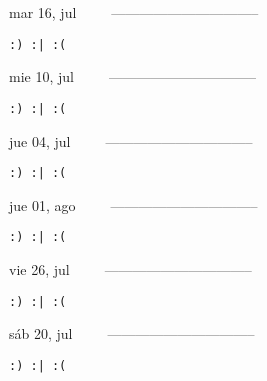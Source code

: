 \documentclass[letterpaper,10pt]{article}
\begin{document}
\begin{multicols}{3}
{mar 16, jul\ \ \ \ \ --------------------------------}
\begin{flushright}\begin{small}\texttt{:) :| :(}\end{small}\end{flushright}
\vfill
{mie 10, jul\ \ \ \ \ --------------------------------}
\begin{flushright}\begin{small}\texttt{:) :| :(}\end{small}\end{flushright}\par
\vfill
{jue 04, jul\ \ \ \ \ --------------------------------}
\begin{flushright}\begin{small}\texttt{:) :| :(}\end{small}\end{flushright}\par
\vfill
\end{multicols}
\vspace{1.05cm}

\begin{multicols}{3}
{jue 01, ago\ \ \ \ \ --------------------------------}
\begin{flushright}\begin{small}\texttt{:) :| :(}\end{small}\end{flushright}
\vfill
{vie 26, jul\ \ \ \ \ --------------------------------}
\begin{flushright}\begin{small}\texttt{:) :| :(}\end{small}\end{flushright}\par
\vfill
{sáb 20, jul\ \ \ \ \ --------------------------------}
\begin{flushright}\begin{small}\texttt{:) :| :(}\end{small}\end{flushright}\par
\vfill
\end{multicols}
\vspace{1.05cm}
\end{document}
